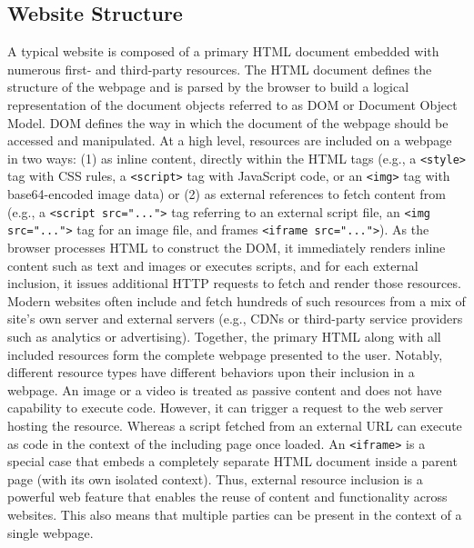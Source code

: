 \subsection{Website Structure}
%
A typical website is composed of a primary HTML document embedded with numerous first- and third-party resources.
%
The HTML document defines the structure of the webpage and is parsed by the browser to build a logical representation of the document objects referred to as DOM or Document Object Model.
%
DOM defines the way in which the document of the webpage should be accessed and manipulated.
%
At a high level, resources are included on a webpage in two ways: (1) as inline content, directly within the HTML tags (e.g., a \texttt{<style>} tag with CSS rules, a \texttt{<script>} tag with JavaScript code, or an \texttt{<img>} tag with base64-encoded image data) or (2) as external references to fetch content from (e.g., a \texttt{<script src="...">} tag referring to an external script file, an \texttt{<img src="...">} tag for an image file, and frames \texttt{<iframe src="...">}).
%
As the browser processes HTML to construct the DOM, it immediately renders inline content such as text and images or executes scripts, and for each external inclusion, it issues additional HTTP requests to fetch and render those resources.
%
Modern websites often include and fetch hundreds of such resources from a mix of site’s own server and external servers (e.g., CDNs or third-party service providers such as analytics or advertising).
%
Together, the primary HTML along with all included resources form the complete webpage presented to the user.
%
Notably, different resource types have different behaviors upon their inclusion in a webpage.
%
An image or a video is treated as passive content and does not have capability to execute code.
%
However, it can trigger a request to the web server hosting the resource.
%
Whereas a script fetched from an external URL can execute as code in the context of the including page once loaded.
%
An \texttt{<iframe>} is a special case that embeds a completely separate HTML document inside a parent page (with its own isolated context).
%
Thus, external resource inclusion is a powerful web feature that enables the reuse of content and functionality across websites.
%
This also means that multiple parties can be present in the context of a single webpage.


